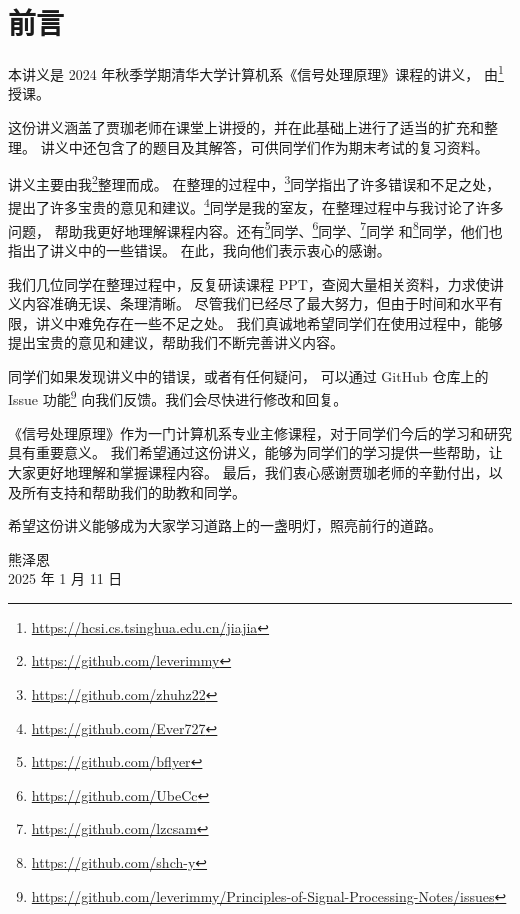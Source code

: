 \section*{前言}

本讲义是 2024 年秋季学期清华大学计算机系《信号处理原理》课程的讲义，
由\footnote{\url{https://hcsi.cs.tsinghua.edu.cn/jiajia}}授课。

这份讲义涵盖了贾珈老师在课堂上讲授的，并在此基础上进行了适当的扩充和整理。
讲义中还包含了的题目及其解答，可供同学们作为期末考试的复习资料。

讲义主要由我\footnote{\url{https://github.com/leverimmy}}整理而成。
在整理的过程中，\footnote{\url{https://github.com/zhuhz22}}同学指出了许多错误和不足之处，
提出了许多宝贵的意见和建议。\footnote{\url{https://github.com/Ever727}}同学是我的室友，在整理过程中与我讨论了许多问题，
帮助我更好地理解课程内容。还有\footnote{\url{https://github.com/bflyer}}同学、\footnote{\url{https://github.com/UbeCc}}同学、\footnote{\url{https://github.com/lzcsam}}同学
和\footnote{\url{https://github.com/shch-y}}同学，他们也指出了讲义中的一些错误。
在此，我向他们表示衷心的感谢。

我们几位同学在整理过程中，反复研读课程 PPT，查阅大量相关资料，力求使讲义内容准确无误、条理清晰。
尽管我们已经尽了最大努力，但由于时间和水平有限，讲义中难免存在一些不足之处。
我们真诚地希望同学们在使用过程中，能够提出宝贵的意见和建议，帮助我们不断完善讲义内容。

同学们如果发现讲义中的错误，或者有任何疑问，
可以通过 GitHub 仓库上的 Issue 功能\footnote{\url{https://github.com/leverimmy/Principles-of-Signal-Processing-Notes/issues}}
向我们反馈。我们会尽快进行修改和回复。

《信号处理原理》作为一门计算机系专业主修课程，对于同学们今后的学习和研究具有重要意义。
我们希望通过这份讲义，能够为同学们的学习提供一些帮助，让大家更好地理解和掌握课程内容。
最后，我们衷心感谢贾珈老师的辛勤付出，以及所有支持和帮助我们的助教和同学。

希望这份讲义能够成为大家学习道路上的一盏明灯，照亮前行的道路。

\begin{flushright}
    熊泽恩 \\
    2025 年 1 月 11 日
\end{flushright}
